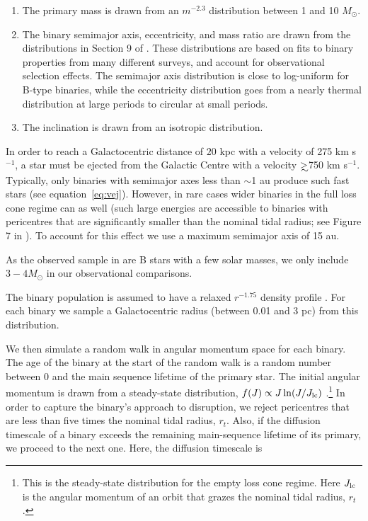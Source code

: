 \documentclass[fleqn,usenatbib]{mnras}
\newcommand\gsim{\mathrel{\rlap{\lower4pt\hbox{\hskip1pt$\sim$}}
    \raise1pt\hbox{$>$}}}
\begin{document}
\begin{enumerate}
\item The primary mass is drawn from an $m^{-2.3}$ distribution between 1 and 10 $M_{\odot}$.
\item The binary semimajor axis, eccentricity, and mass ratio are drawn from the distributions in Section 9 of \citet{moe+2017}. These distributions are based on fits to binary properties from many different surveys, and account for observational selection effects. The semimajor axis distribution is close to log-uniform for B-type binaries, while the eccentricity distribution goes from a nearly thermal distribution at large periods to circular at small periods.
\item The inclination is drawn from an isotropic distribution. 
\end{enumerate}
In order to reach a Galactocentric distance of $20$ kpc with a velocity of 275 km s$^{-1}$, a star must be ejected from the Galactic Centre with a velocity $\gsim$750 km s$^{-1}$. Typically, only binaries with semimajor axes less than $\sim$1 au produce such fast stars (see equation~\ref{eq:vej}). However, in rare cases wider binaries in the full loss cone regime can as well (such large energies are accessible to binaries with pericentres that are significantly smaller than the nominal tidal radius; see Figure 7 in \citealt{sari+2010}). To account for this effect we use a maximum semimajor axis of 15 au. 

As the observed sample in \citet{warren_brown+2018} are B stars with a few solar masses, we only include $3-4 M_{\odot}$ in our observational comparisons.

The binary population is assumed to have a relaxed $r^{-1.75}$ density profile \citep{bahcall&wolf1976}. For each binary we sample a Galactocentric radius (between 0.01 and 3 pc) from this distribution. 


We then simulate a random walk in angular momentum space for each binary. The age of the binary at the start of the random walk is a random number between 0 and the main sequence lifetime of the primary star.  The initial angular momentum is drawn from a steady-state distribution, $f(J)\propto J \ln (J/J_{\rm lc})$ \citep{merritt2010}.\footnote{This is the steady-state distribution for the empty loss cone regime. Here $J_{\rm lc}$ is the angular momentum of an orbit that grazes the nominal tidal radius, $r_t$.} In order to capture the binary's approach to disruption, we reject pericentres that are less than five times the nominal tidal radius, $r_t$. Also, if the diffusion timescale of a binary exceeds the remaining main-sequence lifetime of its primary, we proceed to the next one. Here, the diffusion timescale is 
\end{document}
